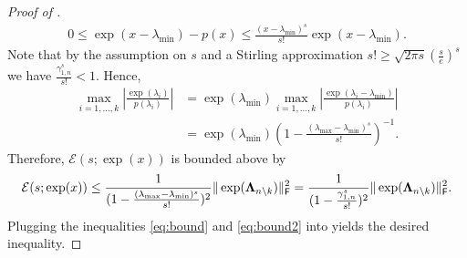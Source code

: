 \begin{appendices}
\begin{proof}[Proof of ]
    \begin{align*}
       0 \leq  \exp(x-\lambda_{\min}) - p(x) 
       \leq \frac{(x-\lambda_{\min})^s}{s!} \exp(x-\lambda_{\min}).
    \end{align*}
    Note that by the assumption on $s$ and a Stirling approximation $s! \geq \sqrt{2\pi s} \left(\frac{s}{e}\right)^s$ \cite{stirling} we have $\frac{\gamma_{1,n}^s}{s!} < 1$.
    Hence,
    \begin{align}\label{eq:bound}
        \max\limits_{i=1,\ldots,k} \left|\frac{\exp(\lambda_i)}{p(\lambda_i)}\right| &= \exp(\lambda_{\min})\max\limits_{i=1,\ldots,k} \left|\frac{\exp(\lambda_i - \lambda_{\min})}{p(\lambda_i)}\right| 
        \nonumber\\&
        = \exp(\lambda_{\min}) \left(1- \frac{(\lambda_{\max}-\lambda_{\min})^s}{s!}\right)^{-1}. 
    \end{align}
    Therefore, $\mathcal{E}(s;\exp(x))$ is bounded above by 
    \begin{equation}\label{eq:bound2}
        \mathcal{E}(s;\exp(x)) \leq \frac{1}{(1- \frac{(\lambda_{\max}-\lambda_{\min})^s}{s!})^2} \|\exp(\bm{\Lambda}_{n \setminus k})\|_{\textsf{\textup{F}}}^2 = \frac{1}{(1- \frac{\gamma_{1,n}^s}{s!})^2} \|\exp(\bm{\Lambda}_{n \setminus k})\|_{\textsf{\textup{F}}}^2.
    \end{equation}
    Plugging the inequalities  \eqref{eq:bound} and \eqref{eq:bound2} into  yields the desired inequality. 
\end{proof}


\end{appendices}
